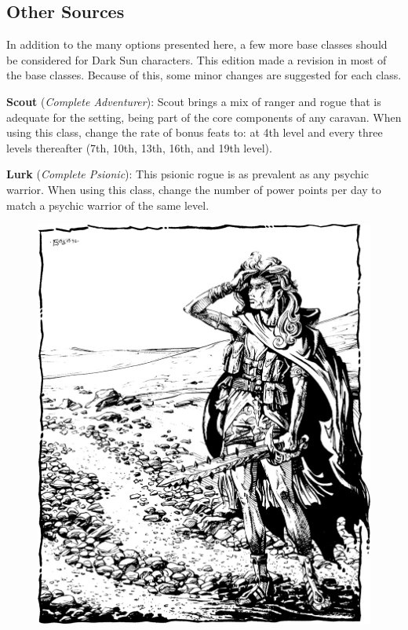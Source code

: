 
\subsection{Other Sources}
In addition to the many options presented here, a few more base classes should be considered for {\tableheader Dark Sun} characters. This edition made a revision in most of the base classes. Because of this, some minor changes are suggested for each class.

\textbf{Scout} (\emph{Complete Adventurer}): Scout brings a mix of ranger and rogue that is adequate for the setting, being part of the core components of any caravan. When using this class, change the rate of bonus feats to: at 4th level and every three levels thereafter (7th, 10th, 13th, 16th, and 19th level).

\textbf{Lurk} (\emph{Complete Psionic}): This psionic rogue is as prevalent as any psychic warrior. When using this class, change the number of power points per day to match a psychic warrior of the same level.

\begin{figure}[b]
\centering
\includegraphics[width=\textwidth]{images/adventurer-1.png}
\WOTC
\end{figure}


